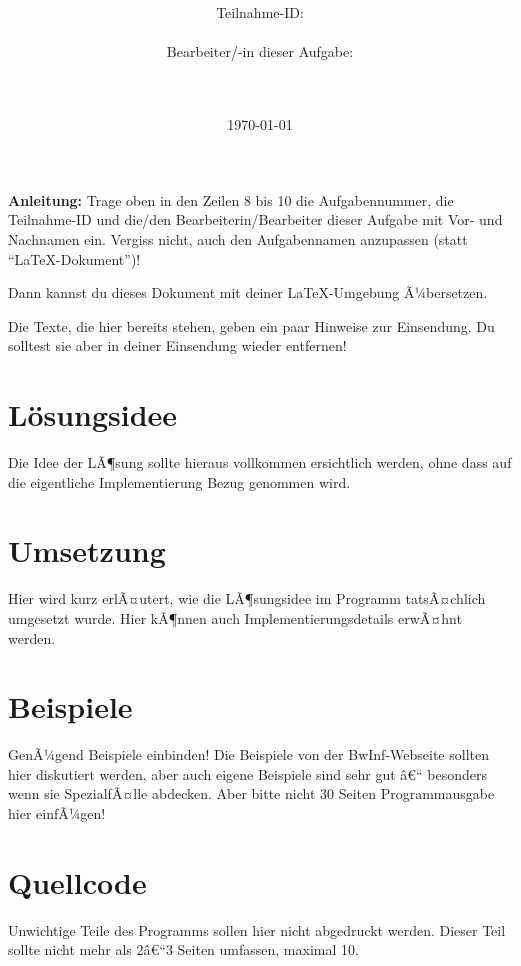 \documentclass[a4paper,10pt,ngerman]{scrartcl}
\title{\textbf{\Huge\Aufgabe}}
\author{\LARGE Teilnahme-ID: \LARGE \TeilnahmeId \\\\
	    \LARGE Bearbeiter/-in dieser Aufgabe: \\ 
	    \LARGE \Name\\\\}
\date{\LARGE\today}
\begin{document}
\maketitle
\tableofcontents

\vspace{0.5cm}

\textbf{Anleitung:} Trage oben in den Zeilen 8 bis 10 die Aufgabennummer, die Teilnahme-ID und die/den Bearbeiterin/Bearbeiter dieser Aufgabe mit Vor- und Nachnamen ein.
Vergiss nicht, auch den Aufgabennamen anzupassen (statt "`\LaTeX-Dokument"')!

Dann kannst du dieses Dokument mit deiner \LaTeX-Umgebung Ã¼bersetzen.

Die Texte, die hier bereits stehen, geben ein paar Hinweise zur
Einsendung. Du solltest sie aber in deiner Einsendung wieder entfernen!

\section{Lösungsidee}
Die Idee der LÃ¶sung sollte hieraus vollkommen ersichtlich werden, ohne dass auf die eigentliche Implementierung Bezug genommen wird.

\section{Umsetzung}
Hier wird kurz erlÃ¤utert, wie die LÃ¶sungsidee im Programm tatsÃ¤chlich umgesetzt wurde. Hier kÃ¶nnen auch Implementierungsdetails erwÃ¤hnt werden.

\section{Beispiele}
GenÃ¼gend Beispiele einbinden! Die Beispiele von der BwInf-Webseite sollten hier diskutiert werden, aber auch eigene Beispiele sind sehr gut â€“ besonders wenn sie SpezialfÃ¤lle abdecken. Aber bitte nicht 30 Seiten Programmausgabe hier einfÃ¼gen!

\section{Quellcode}
Unwichtige Teile des Programms sollen hier nicht abgedruckt werden. Dieser Teil sollte nicht mehr als 2â€“3 Seiten umfassen, maximal 10.
\end{document}
